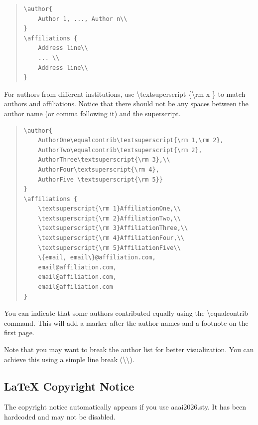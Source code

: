 \begin{quote}\begin{scriptsize}\begin{verbatim}
\author{
    Author 1, ..., Author n\\
}
\affiliations {
    Address line\\
    ... \\
    Address line\\
}
\end{verbatim}\end{scriptsize}\end{quote}


\noindent For authors from different institutions, use \textbackslash textsuperscript \{\textbackslash rm x \} to match authors and affiliations. Notice that there should not be any spaces between the author name (or comma following it) and the superscript.

\begin{quote}\begin{scriptsize}\begin{verbatim}
\author{
    AuthorOne\equalcontrib\textsuperscript{\rm 1,\rm 2},
    AuthorTwo\equalcontrib\textsuperscript{\rm 2},
    AuthorThree\textsuperscript{\rm 3},\\
    AuthorFour\textsuperscript{\rm 4},
    AuthorFive \textsuperscript{\rm 5}}
}
\affiliations {
    \textsuperscript{\rm 1}AffiliationOne,\\
    \textsuperscript{\rm 2}AffiliationTwo,\\
    \textsuperscript{\rm 3}AffiliationThree,\\
    \textsuperscript{\rm 4}AffiliationFour,\\
    \textsuperscript{\rm 5}AffiliationFive\\
    \{email, email\}@affiliation.com,
    email@affiliation.com,
    email@affiliation.com,
    email@affiliation.com
}
\end{verbatim}\end{scriptsize}\end{quote}

You can indicate that some authors contributed equally using the \textbackslash equalcontrib command. This will add a marker after the author names and a footnote on the first page.

Note that you may want to  break the author list for better visualization. You can achieve this using a simple line break (\textbackslash  \textbackslash).

\subsection{\LaTeX{} Copyright Notice}
The copyright notice automatically appears if you use aaai2026.sty. It has been hardcoded and may not be disabled.

